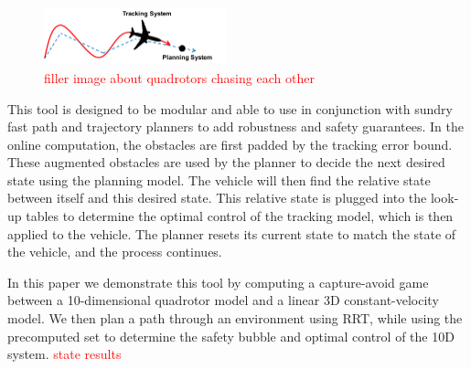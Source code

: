 \begin{figure}
	\centering
	\includegraphics[width=0.47\textwidth]{fig/chasing}
	\caption{\textcolor{red}{filler image about quadrotors chasing each other}}
	\label{fig:chasing}
\end{figure}

This tool is designed to be modular and able to use in conjunction with sundry fast path and trajectory planners to add robustness and safety guarantees. In the online computation, the obstacles are first padded by the tracking error bound. These augmented obstacles are used by the planner to decide the next desired state using the planning model. The vehicle will then find the relative state between itself and this desired state. This relative state is plugged into the look-up tables to determine the optimal control of the tracking model, which is then applied to the vehicle. The planner resets its current state to match the state of the vehicle, and the process continues.

In this paper we demonstrate this tool by computing a capture-avoid game between a 10-dimensional quadrotor model and a linear 3D constant-velocity model. We then plan a path through an environment using RRT, while using the precomputed set to determine the safety bubble and optimal control of the 10D system. \textcolor{red}{state results}